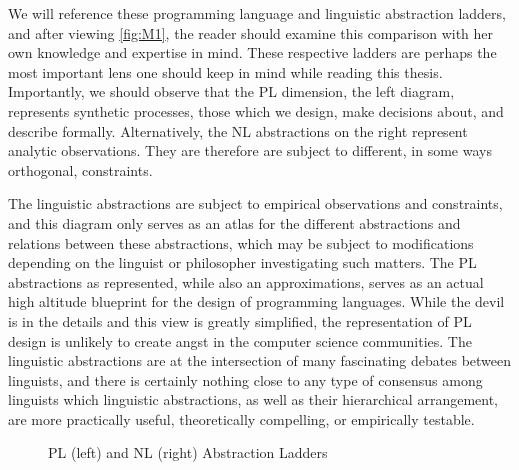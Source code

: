 We will reference these programming language and linguistic abstraction ladders,
and after viewing \autoref{fig:M1}, the reader should examine this
comparison with her own knowledge and expertise in mind. These respective
ladders are perhaps the most important lens one should keep in mind while
reading this thesis. Importantly, we should observe that the PL dimension, the
left diagram, represents synthetic processes, those which we design, make
decisions about, and describe formally. Alternatively, the NL abstractions on
the right represent analytic observations. They are therefore are subject to
different, in some ways orthogonal, constraints.

The linguistic abstractions are subject to empirical observations and
constraints, and this diagram only serves as an atlas for the different
abstractions and relations between these abstractions, which may be subject to
modifications depending on the linguist or philosopher investigating such
matters. The PL abstractions as represented, while also an approximations,
serves as an actual high altitude blueprint for the design of programming
languages. While the devil is in the details and this view is greatly
simplified, the representation of PL design is unlikely to create angst in the
computer science communities. The linguistic abstractions are at the
intersection of many fascinating debates between linguists, and there is
certainly nothing close to any type of consensus among linguists which
linguistic abstractions, as well as their hierarchical arrangement, are more
practically useful, theoretically compelling, or empirically testable.


\begin{figure}
\centering
{}
\hspace{1cm}
\caption{PL (left) and NL (right) Abstraction Ladders} \label{fig:M1}
\end{figure}



